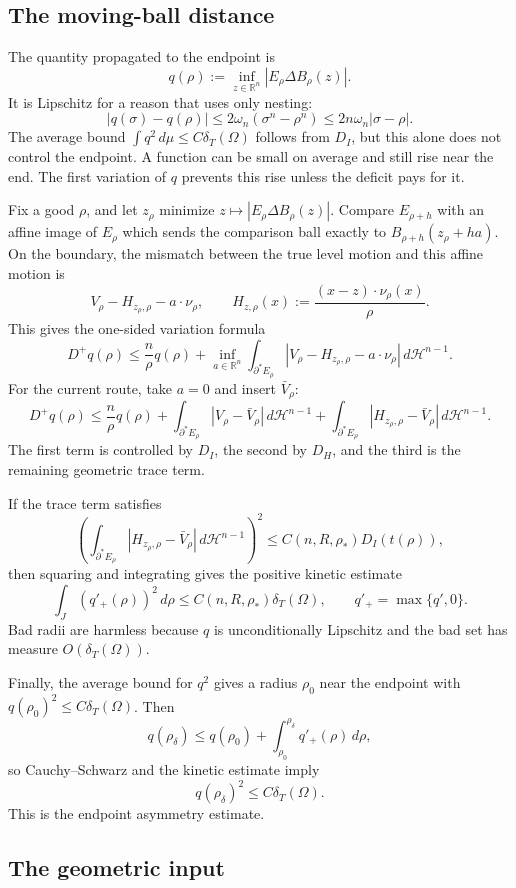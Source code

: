 \documentclass[10pt]{article}
\newcommand{\Om}{\Omega}
\newcommand{\R}{\mathbb R}
\newcommand{\Hh}{\mathcal H}
\newcommand{\dT}{\delta_T}
\begin{document}
\subsection*{The moving-ball distance}

The quantity propagated to the endpoint is
\[
   q(\rho):=\inf_{z\in\R^n}|E_\rho\Delta B_\rho(z)|.
\]
It is Lipschitz for a reason that uses only nesting:
\[
   |q(\sigma)-q(\rho)|
   \le 2\omega_n(\sigma^n-\rho^n)
   \le 2n\omega_n|\sigma-\rho|.
\]
The average bound $\int q^2\,d\mu\le C\dT(\Om)$ follows from $D_I$, but this alone does not control the endpoint. A function can be small on average and still rise near the end. The first variation of $q$ prevents this rise unless the deficit pays for it.

Fix a good $\rho$, and let $z_\rho$ minimize $z\mapsto |E_\rho\Delta B_\rho(z)|$. Compare $E_{\rho+h}$ with an affine image of $E_\rho$ which sends the comparison ball exactly to $B_{\rho+h}(z_\rho+ha)$. On the boundary, the mismatch between the true level motion and this affine motion is
\[
   V_\rho-H_{z_\rho,\rho}-a\cdot\nu_\rho,
   \qquad
   H_{z,\rho}(x):=\frac{(x-z)\cdot\nu_\rho(x)}{\rho}.
\]
This gives the one-sided variation formula
\[
   D^+q(\rho)
   \le \frac n\rho q(\rho)
   +\inf_{a\in\R^n}\int_{\partial^*E_\rho}
      |V_\rho-H_{z_\rho,\rho}-a\cdot\nu_\rho|\,d\Hh^{n-1}.
\]
For the current route, take $a=0$ and insert $\bar V_\rho$:
\[
D^+q(\rho)
\le \frac n\rho q(\rho)
+\int_{\partial^*E_\rho}|V_\rho-\bar V_\rho|\,d\Hh^{n-1}
+\int_{\partial^*E_\rho}|H_{z_\rho,\rho}-\bar V_\rho|\,d\Hh^{n-1}.
\]
The first term is controlled by $D_I$, the second by $D_H$, and the third is the remaining geometric trace term.

If the trace term satisfies
\[
\left(\int_{\partial^*E_\rho}|H_{z_\rho,\rho}-\bar V_\rho|\,d\Hh^{n-1}\right)^2
\le C(n,R,\rho_*)D_I(t(\rho)),
\]
then squaring and integrating gives the positive kinetic estimate
\[
   \int_J (q'_+(\rho))^2\,d\rho\le C(n,R,\rho_*)\dT(\Om),
   \qquad q'_+=\max\{q',0\}.
\]
Bad radii are harmless because $q$ is unconditionally Lipschitz and the bad set has measure $O(\dT(\Om))$.

Finally, the average bound for $q^2$ gives a radius $\rho_0$ near the endpoint with $q(\rho_0)^2\le C\dT(\Om)$. Then
\[
   q(\rho_\delta)
   \le q(\rho_0)+\int_{\rho_0}^{\rho_\delta}q'_+(\rho)\,d\rho,
\]
so Cauchy--Schwarz and the kinetic estimate imply
\[
   q(\rho_\delta)^2\le C\dT(\Om).
\]
This is the endpoint asymmetry estimate.

\subsection*{The geometric input}
\end{document}
